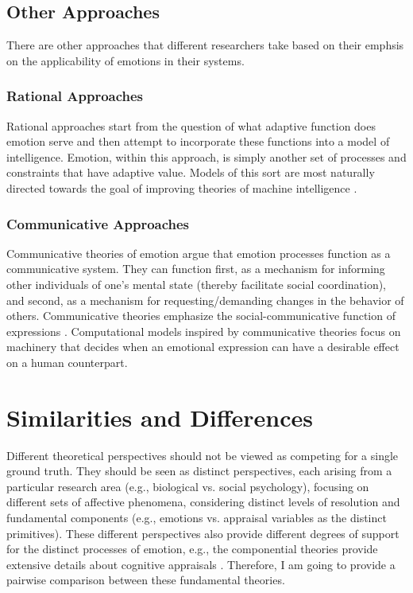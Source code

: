 \documentclass[11pt]{article}
\begin{document}
\subsection{Other Approaches}

There are other approaches that different researchers take based on their
emphsis on the applicability of emotions in their systems.

\subsubsection{Rational Approaches}

Rational approaches start from the question of what adaptive function does
emotion serve and then attempt to incorporate these functions into a model of
intelligence. Emotion, within this approach, is simply another set of processes
and constraints that have adaptive value. Models of this sort are most naturally
directed towards the goal of improving theories of machine intelligence
\cite{anderson:newell-cognition} \cite{scheutz:affect-agent}
\cite{simon:motivation-emotion-cognition}.

\subsubsection{Communicative Approaches}

Communicative theories of emotion argue that emotion processes function as a
communicative system. They can function first, as a mechanism for informing
other individuals of one’s mental state (thereby facilitate social
coordination), and second, as a mechanism for requesting/demanding changes in
the behavior of others. Communicative theories emphasize the
social-communicative function of expressions \cite{gratch:emotion-intention}.
Computational models inspired by communicative theories focus on machinery that
decides when an emotional expression can have a desirable effect on a human
counterpart.

\section{Similarities and Differences}
\label{sec:comparison}

Different theoretical perspectives should not be viewed as competing for a
single ground truth. They should be seen as distinct perspectives, each arising
from a particular research area (e.g., biological vs. social psychology),
focusing on different sets of affective phenomena, considering distinct levels
of resolution and fundamental components (e.g., emotions vs. appraisal variables
as the distinct primitives). These different perspectives also provide different
degrees of support for the distinct processes of emotion, e.g., the componential
theories provide extensive details about cognitive appraisals
\cite{hudlicka:guidelines-emotions}. Therefore, I am going to provide a
pairwise comparison between these fundamental theories.
\end{document}
